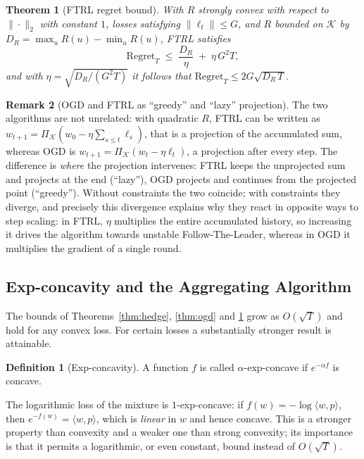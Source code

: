 \documentclass[12pt,a4paper,oneside]{report}
\renewcommand{\_}{\oldunderscore\allowbreak}
\theoremstyle{definition}
\newtheorem{definition}{Definition}[chapter]
\theoremstyle{plain}
\newtheorem{theorem}{Theorem}[chapter]
\theoremstyle{definition}   %
\newtheorem{remark}[theorem]{Remark}
\begin{document}
\begin{theorem}[FTRL regret bound]
\label{thm:ftrl}
With $R$ strongly convex with respect to $\|\cdot\|_2$ with constant $1$, losses satisfying
$\|\ell_t\|\leq G$, and $R$ bounded on $\mathcal{K}$ by $D_R = \max_u R(u) - \min_u R(u)$, FTRL
satisfies
\[
\mathrm{Regret}_T \;\leq\; \frac{D_R}{\eta} \;+\; \eta\, G^2 T,
\]
and with $\eta = \sqrt{D_R/(G^2T)}$ it follows that $\mathrm{Regret}_T \leq 2G\sqrt{D_R\, T}$.
\end{theorem}

\begin{remark}[OGD and FTRL as ``greedy'' and ``lazy'' projection]
The two algorithms are not unrelated: with quadratic $R$, FTRL can be written as
$w_{t+1} = \Pi_{\mathcal{K}}(w_0 - \eta\sum_{s\leq t}\ell_s)$, that is a projection of the
accumulated sum, whereas OGD is $w_{t+1} = \Pi_{\mathcal{K}}(w_t - \eta\ell_t)$, a projection
after every step. The difference is \emph{where} the projection intervenes: FTRL keeps the
unprojected sum and projects at the end (``lazy''), OGD projects and continues from the
projected point (``greedy''). Without constraints the two coincide; with constraints they
diverge, and precisely this divergence explains why they react in opposite ways to step
scaling: in FTRL, $\eta$ multiplies the entire accumulated history, so increasing it drives the
algorithm towards unstable Follow-The-Leader, whereas in OGD it multiplies the gradient of a
single round.
\end{remark}

\subsection{Exp-concavity and the Aggregating Algorithm}
\label{sec:expconcave}

The bounds of Theorems~\ref{thm:hedge}, \ref{thm:ogd} and \ref{thm:ftrl} grow as $O(\sqrt{T})$
and hold for any convex loss. For certain losses a
substantially stronger result is attainable.

\begin{definition}[Exp-concavity]
A function $f$ is called $\alpha$-exp-concave if $e^{-\alpha f}$ is concave.
\end{definition}

The logarithmic loss of the mixture is $1$-exp-concave: if $f(w) = -\log \langle w, p\rangle$,
then $e^{-f(w)} = \langle w, p\rangle$, which is \emph{linear} in $w$ and hence concave. This
is a stronger property than convexity and a weaker one than strong convexity; its importance is
that it permits a logarithmic, or even constant, bound instead of $O(\sqrt{T})$.
\end{document}
